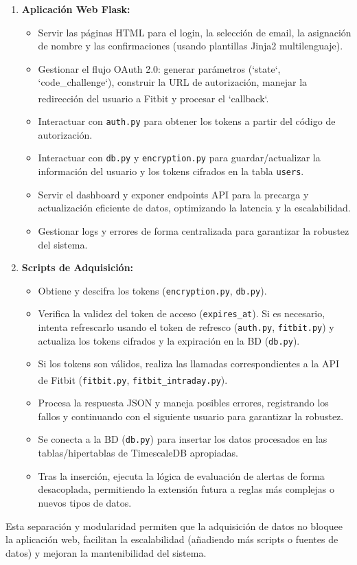 \begin{enumerate}
    \item \textbf{Aplicación Web Flask:} 
        \begin{itemize}
            \item Servir las páginas HTML para el login, la selección de email, la asignación de nombre y las confirmaciones (usando plantillas Jinja2 multilenguaje).
            \item Gestionar el flujo OAuth 2.0: generar parámetros (`state`, `code\_challenge`), construir la URL de autorización, manejar la redirección del usuario a Fitbit\textsuperscript{\textregistered} y procesar el `callback`.
            \item Interactuar con \texttt{auth.py} para obtener los tokens a partir del código de autorización.
            \item Interactuar con \texttt{db.py} y \texttt{encryption.py} para guardar/actualizar la información del usuario y los tokens cifrados en la tabla \texttt{users}.
            \item Servir el dashboard y exponer endpoints API para la precarga y actualización eficiente de datos, optimizando la latencia y la escalabilidad.
            \item Gestionar logs y errores de forma centralizada para garantizar la robustez del sistema.
        \end{itemize}
    \item \textbf{Scripts de Adquisición:} 
        \begin{itemize}
            \item Obtiene y descifra los tokens (\texttt{encryption.py}, \texttt{db.py}).
            \item Verifica la validez del token de acceso (\texttt{expires\_at}). Si es necesario, intenta refrescarlo usando el token de refresco (\texttt{auth.py}, \texttt{fitbit.py}) y actualiza los tokens cifrados y la expiración en la BD (\texttt{db.py}).
            \item Si los tokens son válidos, realiza las llamadas correspondientes a la API de Fitbit\textsuperscript{\textregistered} (\texttt{fitbit.py}, \texttt{fitbit\_intraday.py}).
            \item Procesa la respuesta JSON y maneja posibles errores, registrando los fallos y continuando con el siguiente usuario para garantizar la robustez.
            \item Se conecta a la BD (\texttt{db.py}) para insertar los datos procesados en las tablas/hipertablas de TimescaleDB apropiadas.
            \item Tras la inserción, ejecuta la lógica de evaluación de alertas de forma desacoplada, permitiendo la extensión futura a reglas más complejas o nuevos tipos de datos.
        \end{itemize}
\end{enumerate}
Esta separación y modularidad permiten que la adquisición de datos no bloquee la aplicación web, facilitan la escalabilidad (añadiendo más scripts o fuentes de datos) y mejoran la mantenibilidad del sistema.

